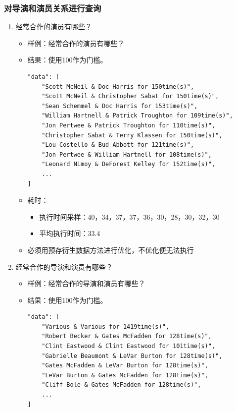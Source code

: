 \documentclass{ctexrep}
\begin{document}
    \subsubsection{对导演和演员关系进行查询}
		\begin{enumerate}
    		\item 经常合作的演员有哪些？
        		\begin{itemize}
        			\item 样例：经常合作的演员有哪些？
        			\item 结果：使用100作为门槛。
        			    \begin{lstlisting}
"data": [
    "Scott McNeil & Doc Harris for 150time(s)",
    "Scott McNeil & Christopher Sabat for 150time(s)",
    "Sean Schemmel & Doc Harris for 153time(s)",
    "William Hartnell & Patrick Troughton for 109time(s)",
    "Jon Pertwee & Patrick Troughton for 110time(s)",
    "Christopher Sabat & Terry Klassen for 150time(s)",
    "Lou Costello & Bud Abbott for 121time(s)",
    "Jon Pertwee & William Hartnell for 108time(s)",
    "Leonard Nimoy & DeForest Kelley for 152time(s)",
    ...
]
        			    \end{lstlisting}
        			\item 耗时：
        			    \begin{itemize}
        			        \item 执行时间采样：40，34，37，37，36，30，28，30，32，30
        			        \item 平均执行时间：33.4
        			    \end{itemize}
        		    \item 必须用预存衍生数据方法进行优化，不优化便无法执行
        		\end{itemize}
            \item 经常合作的导演和演员有哪些？
        		\begin{itemize}
        			\item 样例：经常合作的导演和演员有哪些？
        			\item 结果：使用100作为门槛。
        			    \begin{lstlisting}
"data": [
    "Various & Various for 1419time(s)",
    "Robert Becker & Gates McFadden for 128time(s)",
    "Clint Eastwood & Clint Eastwood for 101time(s)",
    "Gabrielle Beaumont & LeVar Burton for 128time(s)",
    "Gates McFadden & LeVar Burton for 128time(s)",
    "LeVar Burton & Gates McFadden for 128time(s)",
    "Cliff Bole & Gates McFadden for 128time(s)",
    ...
]
        			    \end{lstlisting}

\end{itemize}
\end{enumerate}
\end{document}
